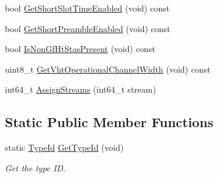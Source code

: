 \begin{DoxyCompactItemize}
\item 
bool \hyperlink{classns3_1_1ApWifiMac_abc972d9a628f6b50b27a05b1e464bbcd}{Get\+Short\+Slot\+Time\+Enabled} (void) const 
\item 
bool \hyperlink{classns3_1_1ApWifiMac_a19ae41add0c00c244c7a66adf523b445}{Get\+Short\+Preamble\+Enabled} (void) const 
\item 
bool \hyperlink{classns3_1_1ApWifiMac_a402b8852eba84458667b666df75b589f}{Is\+Non\+Gf\+Ht\+Stas\+Present} (void) const 
\item 
uint8\+\_\+t \hyperlink{classns3_1_1ApWifiMac_abec5a8ca80c9649d59eeaf37eb091bd1}{Get\+Vht\+Operational\+Channel\+Width} (void) const 
\item 
int64\+\_\+t \hyperlink{classns3_1_1ApWifiMac_aab3410af41c0477ddaf60bc3f6659de9}{Assign\+Streams} (int64\+\_\+t stream)
\end{DoxyCompactItemize}
\subsection*{Static Public Member Functions}
\begin{DoxyCompactItemize}
\item 
static \hyperlink{classns3_1_1TypeId}{Type\+Id} \hyperlink{classns3_1_1ApWifiMac_aa7cd3c1ec15889267ab5b5e183b91d2b}{Get\+Type\+Id} (void)
\begin{DoxyCompactList}\small\item\em Get the type ID. \end{DoxyCompactList}\end{DoxyCompactItemize}
